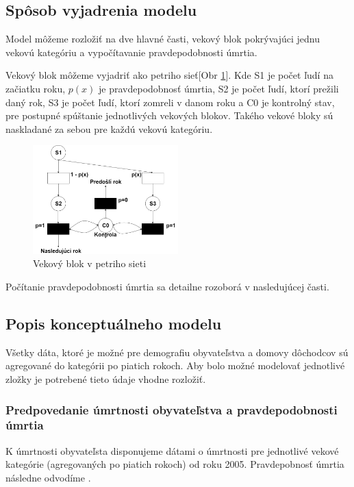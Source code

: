 \documentclass[a4paper, 11pt]{article}
\begin{document}
\subsection{Spôsob vyjadrenia modelu}
Model môžeme rozložiť na dve hlavné časti, vekový blok pokrývajúci jednu vekovú kategóriu a vypočítavanie pravdepodobnosti úmrtia.

Vekový blok môžeme vyjadriť ako petriho sieť\cite[str. 123]{IMS}[Obr \ref{petri}]. Kde S1 je počet ľudí na začiatku roku, $p(x)$ je pravdepodobnosť úmrtia, S2 je počet ľudí, ktorí prežili daný rok, S3 je počet ľudí, ktorí zomreli v danom roku a C0 je kontrolný stav, pre postupné spúštanie jednotlivých vekových blokov. Takého vekové bloky sú naskladané za sebou pre každú vekovú kategóriu.
\renewcommand{\figurename}{Obr}
\begin{figure}[H]
\centering
\includegraphics[width=0.5\textwidth]{petri}
\caption{Vekový blok v petriho sieti\label{petri}}
\end{figure}
Počítanie pravdepodobnosti úmrtia sa detailne rozoborá v nasledujúcej časti.


\subsection{Popis konceptuálneho modelu}
Všetky dáta, ktoré je možné pre demografiu obyvateľstva a domovy dôchodcov sú agregované do kategórii po piatich rokoch. Aby bolo možné modelovať jednotlivé zložky je potrebené tieto údaje vhodne rozložiť.

\subsubsection*{Predpovedanie úmrtnosti obyvateľstva a pravdepodobnosti úmrtia}
K úmrtnosti obyvateľsta disponujeme dátami o úmrtnosti pre jednotlivé vekové kategórie (agregovaných po piatich rokoch) od roku 2005. Pravdepobnosť úmrtia následne odvodíme \cite{prob}.
\end{document}
